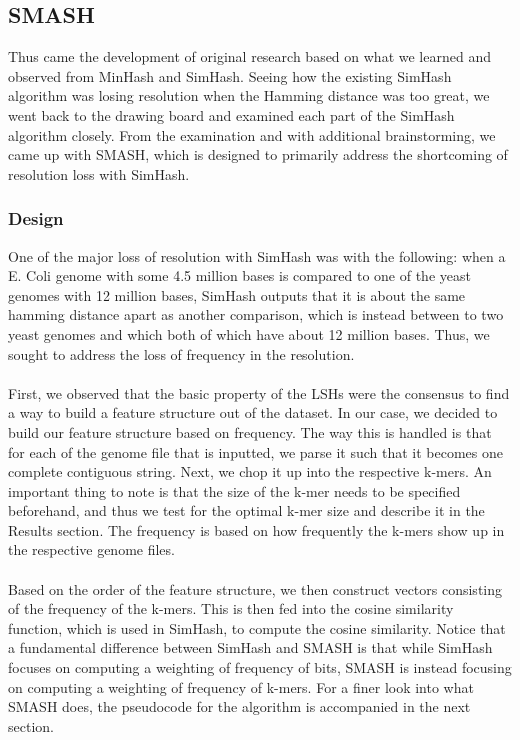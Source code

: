 \documentclass[12pt, letterpaper]{article}
\begin{document}
\subsection{SMASH}
Thus came the development of original research based on what we learned and observed from MinHash and SimHash. Seeing how the existing SimHash algorithm was losing resolution when the Hamming distance was too great, we went back to the drawing board and examined each part of the SimHash algorithm closely. From the examination and with additional brainstorming, we came up with SMASH, which is designed to primarily address the shortcoming of resolution loss with SimHash.

\subsubsection{Design}
One of the major loss of resolution with SimHash was with the following: when a E. Coli genome with some 4.5 million bases is compared to one of the yeast genomes with 12 million bases, SimHash outputs that it is about the same hamming distance apart as another comparison, which is instead between to two yeast genomes and which both of which have about 12 million bases. Thus, we sought to address the loss of frequency in the resolution.  \\ \\
First, we observed that the basic property of the LSHs were the consensus to find a way to build a feature structure out of the dataset. In our case, we decided to build our feature structure based on frequency. The way this is handled is that for each of the genome file that is inputted, we parse it such that it becomes one complete contiguous string. Next, we chop it up into the respective k-mers. An important thing to note is that the size of the k-mer needs to be specified beforehand, and thus we test for the optimal k-mer size and describe it in the Results section. The frequency is based on how frequently the k-mers show up in the respective genome files. \\ \\
Based on the order of the feature structure, we then construct vectors consisting of the frequency of the k-mers. This is then fed into the cosine similarity function, which is used in SimHash, to compute the cosine similarity. Notice that a fundamental difference between SimHash and SMASH is that while SimHash focuses on computing a weighting of frequency of bits, SMASH is instead focusing on computing a weighting of frequency of k-mers. For a finer look into what SMASH does, the pseudocode for the algorithm is accompanied in the next section.
\end{document}
